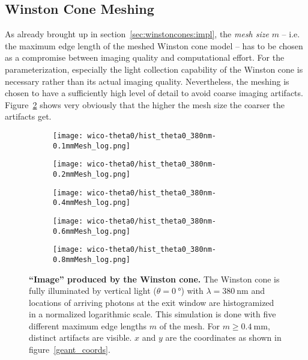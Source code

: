 \subsection{Winston Cone Meshing}\label{sec:wico_meshing}

As already brought up in section~\ref{sec:winstoncones:impl}, the \textit{mesh size} $m$ -- i.e. the maximum edge length of the meshed Winston cone model -- has to be chosen as a compromise between imaging quality and computational effort. For the \iceact parameterization, especially the light collection capability of the Winston cone is necessary rather than its actual imaging quality. Nevertheless, the meshing is chosen to have a sufficiently high level of detail to avoid coarse imaging artifacts. Figure~\ref{wico:theta0_image} shows very obviously that the higher the mesh size the coarser the artifacts get. 

\begin{figure}[H]
	\centering
	\begin{subfigure}[t]{0.495\textwidth}
		\texttt{[image: wico-theta0/hist\_theta0\_380nm-0.1mmMesh\_log.png]}
	\end{subfigure}
	\hfill
	\begin{subfigure}[t]{0.495\textwidth}
		\texttt{[image: wico-theta0/hist\_theta0\_380nm-0.2mmMesh\_log.png]}
	\end{subfigure}
	\vfill
	\begin{subfigure}[t]{0.495\textwidth}
		\texttt{[image: wico-theta0/hist\_theta0\_380nm-0.4mmMesh\_log.png]}
		\label{wico:theta0_image:m04}
	\end{subfigure}
	\hfill
	\begin{subfigure}[t]{0.495\textwidth}
		\texttt{[image: wico-theta0/hist\_theta0\_380nm-0.6mmMesh\_log.png]}
	\end{subfigure}
	\hfill
	\begin{subfigure}[t]{0.495\textwidth}
		\texttt{[image: wico-theta0/hist\_theta0\_380nm-0.8mmMesh\_log.png]}
	\end{subfigure}
	\hfill
	\begin{minipage}[t]{0.495\textwidth}
		\vspace{-190pt}
		\caption[\enquote{Image} produced by the \iceact Winston cone]{\textbf{\enquote{Image} produced by the \iceact Winston cone.} The Winston cone is fully illuminated by vertical light ($\theta=\SI{0}{\degree}$) with $\lambda=\SI{380}{\nano\meter}$ and locations of arriving photons at the exit window are histogramized in a normalized logarithmic scale. This simulation is done with five different maximum edge lengths $m$ of the mesh. For $m\geq\SI{0.4}{\milli\meter}$, distinct artifacts are visible. $x$ and $y$ are the \geant coordinates as shown in figure~\ref{geant_coords}.}
	\end{minipage}
	\label{wico:theta0_image}
\end{figure}

